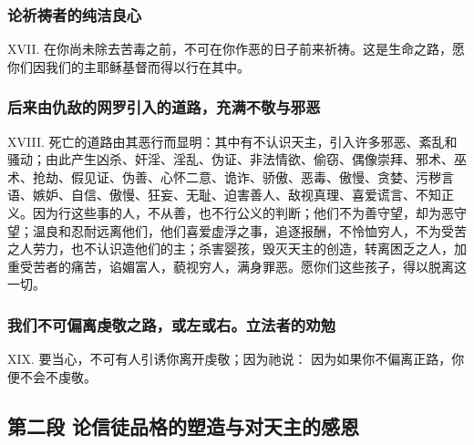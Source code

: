 
\subsubsection{论祈祷者的纯洁良心}

XVII. 在你尚未除去苦毒之前，不可在你作恶的日子前来祈祷。这是生命之路，愿你们因我们的主耶稣基督而得以行在其中。\par


\subsubsection{后来由仇敌的网罗引入的道路，充满不敬与邪恶}

XVIII. 死亡的道路由其恶行而显明：其中有不认识天主，引入许多邪恶、紊乱和骚动；由此产生凶杀、奸淫、淫乱、伪证、非法情欲、偷窃、偶像崇拜、邪术、巫术、抢劫、假见证、伪善、心怀二意、诡诈、骄傲、恶毒、傲慢、贪婪、污秽言语、嫉妒、自信、傲慢、狂妄、无耻、迫害善人、敌视真理、喜爱谎言、不知正义。因为行这些事的人，不从善，也不行公义的判断；他们不为善守望，却为恶守望；温良和忍耐远离他们，他们喜爱虚浮之事，追逐报酬，不怜恤穷人，不为受苦之人劳力，也不认识造他们的主；杀害婴孩，毁灭天主的创造，转离困乏之人，加重受苦者的痛苦，谄媚富人，藐视穷人，满身罪恶。愿你们这些孩子，得以脱离这一切。\par


\subsubsection{我们不可偏离虔敬之路，或左或右。立法者的劝勉}

XIX. 要当心，不可有人引诱你离开虔敬；因为祂说： 因为如果你不偏离正路，你便不会不虔敬。\par


\subsection{第二段 论信徒品格的塑造与对天主的感恩}

